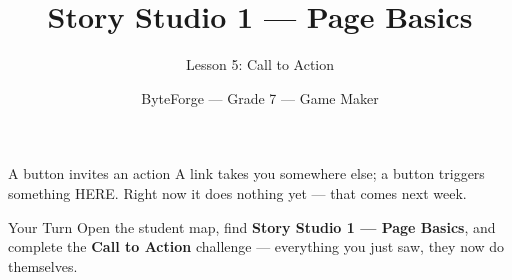 \documentclass[aspectratio=169]{beamer}
\title{Story Studio 1 — Page Basics}
\subtitle{Lesson 5: Call to Action}
\author{ByteForge --- Grade 7 --- Game Maker}
\date{}
\begin{document}
\begin{frame}
    \titlepage
\end{frame}

\begin{frame}{A button invites an action}
    \Large
    A link takes you somewhere else; a button triggers something HERE. Right now it does nothing yet — that comes next week.
\end{frame}

\begin{frame}{Your Turn}
    \Large
    Open the student map, find \textbf{Story Studio 1 — Page Basics}, and complete
    the \textbf{Call to Action} challenge --- everything you just saw, they now do themselves.
\end{frame}
\end{document}
